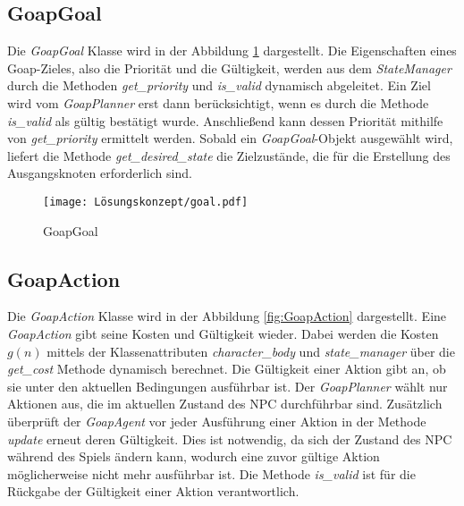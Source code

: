 \subsection{GoapGoal}
\label{chap:goapgoal uml}

Die \textit{GoapGoal} Klasse wird in der Abbildung \ref{fig:GoapGoal} dargestellt. Die Eigenschaften eines Goap-Zieles, also die Priorität und die Gültigkeit, werden aus dem \textit{StateManager} durch die Methoden \textit{get\_priority} und \textit{is\_valid} dynamisch abgeleitet. Ein Ziel wird vom \textit{GoapPlanner} erst dann berücksichtigt, wenn es durch die Methode \textit{is\_valid} als gültig bestätigt wurde. Anschlie\ss{}end kann dessen Priorität mithilfe von \textit{get\_priority} ermittelt werden. Sobald ein \textit{GoapGoal}-Objekt ausgewählt wird, liefert die Methode \textit{get\_desired\_state} die Zielzustände, die für die Erstellung des Ausgangsknoten erforderlich sind.

\begin{figure}[t]
  \centering
  \texttt{[image: Lösungskonzept/goal.pdf]}
	\captionsetup{justification=justified, format=plain}
  \caption{GoapGoal}
  \label{fig:GoapGoal}
\end{figure}







\subsection{GoapAction}
\label{chap:goapaction uml}

Die \textit{GoapAction} Klasse wird in der Abbildung \ref{fig:GoapAction} dargestellt. Eine \textit{GoapAction} gibt seine Kosten und Gültigkeit wieder. Dabei werden die Kosten $g(n)$ mittels der Klassenattributen \textit{character\_body} und \textit{state\_manager} über die \textit{get\_cost} Methode dynamisch berechnet. Die Gültigkeit einer Aktion gibt an, ob sie unter den aktuellen Bedingungen ausführbar ist. Der \textit{GoapPlanner} wählt nur Aktionen aus, die im aktuellen Zustand des NPC durchführbar sind. Zusätzlich überprüft der \textit{GoapAgent} vor jeder Ausführung einer Aktion in der Methode \textit{update} erneut deren Gültigkeit. Dies ist notwendig, da sich der Zustand des NPC während des Spiels ändern kann, wodurch eine zuvor gültige Aktion möglicherweise nicht mehr ausführbar ist. Die Methode \textit{is\_valid} ist für die Rückgabe der Gültigkeit einer Aktion verantwortlich.

